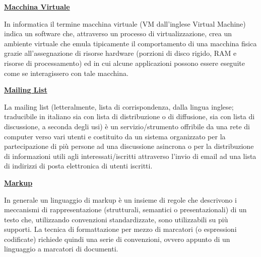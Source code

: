 \vspace*{2\bigskipamount}

\begin{addmargin}[0em]{0em}	
	\textbf{\underline{Macchina Virtuale}} 
\end{addmargin}

\medskip
\begin{addmargin}[5em]{1em}
In informatica il termine macchina virtuale (VM dall'inglese Virtual Machine) indica un software che, attraverso un processo di virtualizzazione, crea un ambiente virtuale che emula tipicamente il comportamento di una macchina fisica grazie all'assegnazione di risorse hardware (porzioni di disco rigido, RAM e risorse di processamento) ed in cui alcune applicazioni possono essere eseguite come se interagissero con tale macchina.
\end{addmargin}	

\bigskip
\begin{addmargin}[0em]{0em}	
	\textbf{\underline{Mailing List}}
\end{addmargin}

\medskip
\begin{addmargin}[5em]{1em}	
La mailing list (letteralmente, lista di corrispondenza, dalla lingua inglese; traducibile in italiano sia con lista di distribuzione o di diffusione, sia con lista di discussione, a seconda degli usi) è un servizio/strumento offribile da una rete di computer verso vari utenti e costituito da un sistema organizzato per la partecipazione di più persone ad una discussione asincrona o per la distribuzione di informazioni utili agli interessati/iscritti attraverso l'invio di email ad una lista di indirizzi di posta elettronica di utenti iscritti.
\end{addmargin}	

\bigskip
\begin{addmargin}[0em]{0em}	
	\textbf{\underline{Markup}} 
\end{addmargin}

\medskip
\begin{addmargin}[5em]{1em}
In generale un linguaggio di markup è un insieme di regole che descrivono i meccanismi di rappresentazione (strutturali, semantici o presentazionali) di un testo che, utilizzando convenzioni standardizzate, sono utilizzabili su più supporti. La tecnica di formattazione per mezzo di marcatori (o espressioni codificate) richiede quindi una serie di convenzioni, ovvero appunto di un linguaggio a marcatori di documenti. 	
\end{addmargin}	

